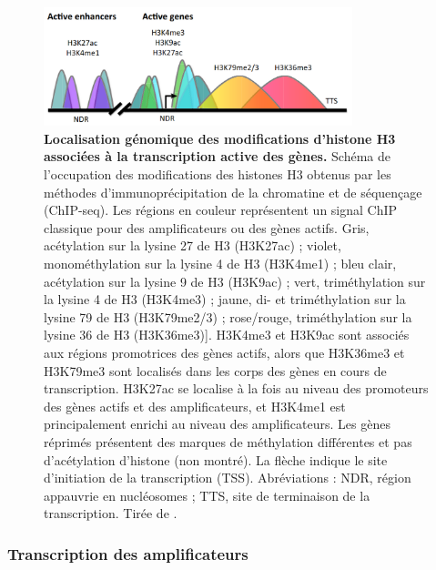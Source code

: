 \begin{figure}[h]
    \centering
    \includegraphics[width=0.8\textwidth, page=1] {figures/introduction/fig9.png}
    \caption[Localisation génomique des modifications d'histone H3 associées à la transcription active des gènes.]{
    \textbf{Localisation génomique des modifications d'histone H3 associées à la transcription active des gènes.}
    Schéma de l'occupation des modifications des histones H3 obtenus par les méthodes d'immunoprécipitation de la chromatine et de séquençage (\acrshort{ChIP-seq}). Les régions en couleur représentent un signal ChIP classique pour des \glspl{amplificateur} ou des gènes actifs.
    Gris, acétylation sur la lysine 27 de H3 (H3K27ac) ; violet, monométhylation sur la lysine 4 de H3 (H3K4me1) ; bleu clair, acétylation sur la lysine 9 de H3 (H3K9ac) ; vert, triméthylation sur la lysine 4 de H3 (H3K4me3) ; jaune, di- et triméthylation sur la lysine 79 de H3 (H3K79me2/3) ; rose/rouge, triméthylation sur la lysine 36 de H3 (H3K36me3)]. H3K4me3 et H3K9ac sont associés aux régions promotrices des gènes actifs, alors que H3K36me3 et H3K79me3 sont localisés dans les corps des gènes en cours de transcription. H3K27ac se localise à la fois au niveau des promoteurs des gènes actifs et des amplificateurs, et H3K4me1 est principalement enrichi au niveau des amplificateurs.
    Les gènes réprimés présentent des marques de méthylation différentes et pas d'acétylation d'histone (non montré). La flèche indique le site d'initiation de la transcription (\acrshort{TSS}). Abréviations : NDR, région appauvrie en nucléosomes ; TTS, site de terminaison de la transcription. Tirée de \citep{bernstein_genomic_2005}.\\
    }
    \label{fig:Fig9}
\end{figure}

\subsubsection{Transcription des \glspl{amplificateur}}
\label{subsubsec:eRNA}


